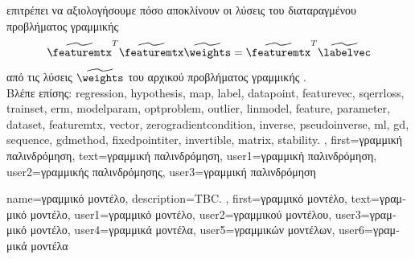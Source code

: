 {{{		επιτρέπει να αξιολογήσουμε πόσο αποκλίνουν οι λύσεις του διαταραγμένου προβλήματος γραμμικής}  
		\cite[\foreignlanguage{greek}{Ενότητα}\ 2.6]{GolubVanLoanBook}
		$$\widetilde{\featuremtx}^{T} \widetilde{\featuremtx} \widetilde{\weights} = 
		\widetilde{\featuremtx}^{T} \widetilde{\labelvec}$$
		\foreignlanguage{greek}{από τις λύσεις $\widetilde{\weights}$ του αρχικού προβλήματος γραμμικής} .
		\\
		\foreignlanguage{greek}{Βλέπε επίσης:} \gls{regression}, \gls{hypothesis}, \gls{map}, \gls{label}, \gls{datapoint}, \gls{featurevec}, 
		\gls{sqerrloss}, \gls{trainset}, \gls{erm}, \gls{modelparam}, \gls{optproblem}, \gls{outlier}, \gls{linmodel}, \gls{feature}, \gls{parameter}, 
		\gls{dataset}, \gls{featuremtx}, \gls{vector}, \gls{zerogradientcondition}, \gls{inverse}, \gls{pseudoinverse}, \gls{ml}, \gls{gd}, \gls{sequence}, 
		\gls{gdmethod}, \gls{fixedpointiter}, \gls{invertible}, \gls{matrix}, \gls{stability}. },
	first={\foreignlanguage{greek}{γραμμική παλινδρόμηση}},
	text={\foreignlanguage{greek}{γραμμική παλινδρόμηση}},
	user1={\foreignlanguage{greek}{γραμμική παλινδρόμηση}}, %
	user2={\foreignlanguage{greek}{γραμμικής παλινδρόμησης}}, %
	user3={\foreignlanguage{greek}{γραμμική παλινδρόμηση}} %
}

{name={\foreignlanguage{greek}{γραμμικό μοντέλο}},
	description={TBC. }, 
	first={\foreignlanguage{greek}{γραμμικό μοντέλο}},
   	text={\foreignlanguage{greek}{γραμμικό μοντέλο}},
   	user1={\foreignlanguage{greek}{γραμμικό μοντέλο}}, %
   	user2={\foreignlanguage{greek}{γραμμικού μοντέλου}}, %
   	user3={\foreignlanguage{greek}{γραμμικό μοντέλο}}, %
   	user4={\foreignlanguage{greek}{γραμμικά μοντέλα}}, %
   	user5={\foreignlanguage{greek}{γραμμικών μοντέλων}}, %
   	user6={\foreignlanguage{greek}{γραμμικά μοντέλα}} %
}

